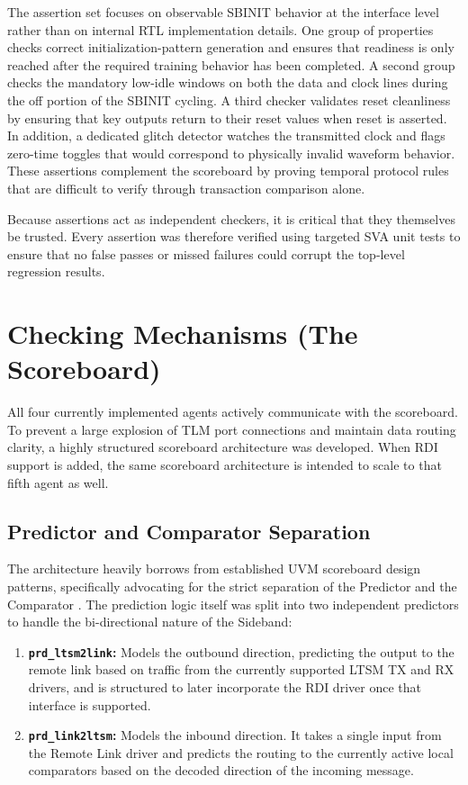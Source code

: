 The assertion set focuses on observable SBINIT behavior at the interface level rather than on internal RTL implementation details. One group of properties checks correct initialization-pattern generation and ensures that readiness is only reached after the required training behavior has been completed. A second group checks the mandatory low-idle windows on both the data and clock lines during the off portion of the SBINIT cycling. A third checker validates reset cleanliness by ensuring that key outputs return to their reset values when reset is asserted. In addition, a dedicated glitch detector watches the transmitted clock and flags zero-time toggles that would correspond to physically invalid waveform behavior. These assertions complement the scoreboard by proving temporal protocol rules that are difficult to verify through transaction comparison alone.

Because assertions act as independent checkers, it is critical that they themselves be trusted. Every assertion was therefore verified using targeted SVA unit tests to ensure that no false passes or missed failures could corrupt the top-level regression results.

\section{Checking Mechanisms (The Scoreboard)}
All four currently implemented agents actively communicate with the scoreboard. To prevent a large explosion of TLM port connections and maintain data routing clarity, a highly structured scoreboard architecture was developed. When RDI support is added, the same scoreboard architecture is intended to scale to that fifth agent as well.

\subsection{Predictor and Comparator Separation}
The architecture heavily borrows from established UVM scoreboard design patterns, specifically advocating for the strict separation of the Predictor and the Comparator \cite{uvm_scoreboard_arch}. The prediction logic itself was split into two independent predictors to handle the bi-directional nature of the Sideband:
\begin{enumerate}
    \item \textbf{\texttt{prd\_ltsm2link}:} Models the outbound direction, predicting the output to the remote link based on traffic from the currently supported LTSM TX and RX drivers, and is structured to later incorporate the RDI driver once that interface is supported.
    \item \textbf{\texttt{prd\_link2ltsm}:} Models the inbound direction. It takes a single input from the Remote Link driver and predicts the routing to the currently active local comparators based on the decoded direction of the incoming message.
\end{enumerate}

